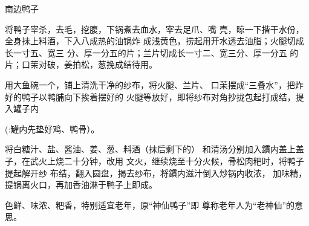 \begin{recipe}[神仙鸭子]{南边鸭子}

\ingredients




\cooking

\step 将鸭子宰杀，去毛，挖腹，下锅煮去血水，宰去足爪、嘴 壳，晾一下揩干水份，全身抹上料酒，下入八成热的油锅炸 成浅黄色，捞起用开水透去油脂；火腿切成长一寸五、宽三 分、厚一分五的片；兰片切成长一寸二、宽三分、厚一分五 的片；口茉对破，姜拍松，葱挽成结待用。

\step 用大鱼碗一个，铺上清洗干净的纱布，将火腿、兰片、 口茉摆成“三叠水”，把炸好的鸭子以鸭脯向下挨着摆好的 火腿等放好，即将纱布对角抄拢包起打成结，提入罐子内

(:罐内先垫好鸡、鸭骨）。

\step 将白糖汁、盐、酱油、姜、葱、料酒（抹后剩下的） 和清汤分别加入鏆内盖上盖子，在武火上烧二十分钟，改用 文火，继续烧至十分火候，骨松肉粑时，将鸭子提起解开纱 布结，翻入圆盘，揭去纱布，将鏆内滋汁倒入炒锅内收浓， 加味精，提锅离火口，再加香油淋于鸭子上即成。

\notes

色鲜、味浓、粑香，特别适宜老年，原“神仙鸭子”即 尊称老年人为“老神仙”的意思。

\end{recipe}

